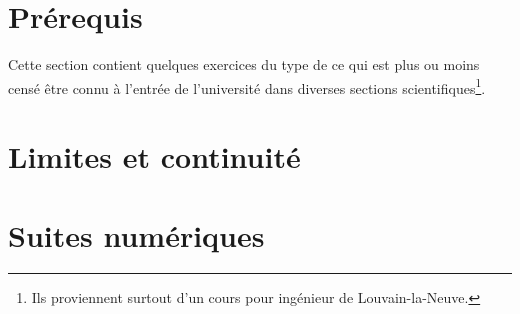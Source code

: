 
\section{Prérequis}

Cette section contient quelques exercices du type de ce qui est plus ou moins censé être connu à l'entrée de l'université dans diverses sections scientifiques\footnote{Ils proviennent surtout d'un cours pour ingénieur de Louvain-la-Neuve.}.





\section{Limites et continuité}


\section{Suites numériques}

